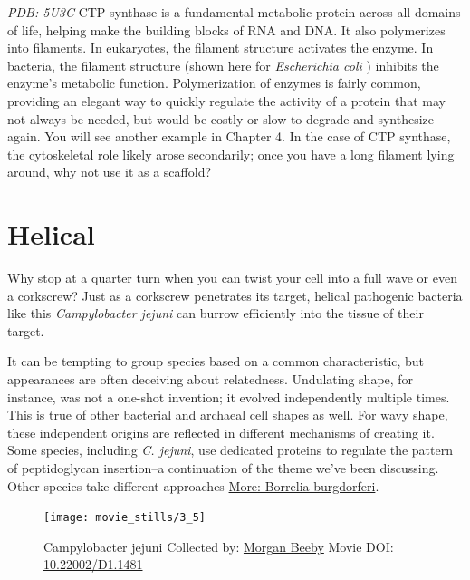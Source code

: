 \documentclass[]{tufte-book}
\begin{document}
\emph{PDB: 5U3C} CTP synthase is a fundamental metabolic protein across
all domains of life, helping make the building blocks of RNA and DNA. It
also polymerizes into filaments. In eukaryotes, the filament structure
activates the enzyme. In bacteria, the filament structure (shown here
for \emph{Escherichia coli} \citep{lynch2017}) inhibits the enzyme's
metabolic function. Polymerization of enzymes is fairly common,
providing an elegant way to quickly regulate the activity of a protein
that may not always be needed, but would be costly or slow to degrade
and synthesize again. You will see another example in Chapter 4. In the
case of CTP synthase, the cytoskeletal role likely arose secondarily;
once you have a long filament lying around, why not use it as a
scaffold?

\section{Helical}\label{helical}

Why stop at a quarter turn when you can twist your cell into a full wave
or even a corkscrew? Just as a corkscrew penetrates its target, helical
pathogenic bacteria like this \emph{Campylobacter jejuni} can burrow
efficiently into the tissue of their target.

It can be tempting to group species based on a common characteristic,
but appearances are often deceiving about relatedness. Undulating shape,
for instance, was not a one-shot invention; it evolved independently
multiple times. This is true of other bacterial and archaeal cell shapes
as well. For wavy shape, these independent origins are reflected in
different mechanisms of creating it. Some species, including \emph{C.
jejuni}, use dedicated proteins to regulate the pattern of peptidoglycan
insertion--a continuation of the theme we've been discussing. Other
species take different approaches
\protect\hyperlink{Borrelia_burgdorferi}{More: Borrelia burgdorferi}.





\begin{figure}
\texttt{[image: movie\_stills/3\_5]} \caption[Campylobacter jejuni Collected by:
\protect\hyperlink{morgan_beeby}{Morgan Beeby} Movie DOI:
\href{https://doi.org/10.22002/D1.1481}{10.22002/D1.1481}]{Campylobacter jejuni Collected by:
\protect\hyperlink{morgan_beeby}{Morgan Beeby} Movie DOI:
\href{https://doi.org/10.22002/D1.1481}{10.22002/D1.1481}}\label{fig:3-5}
\end{figure}
\end{document}
